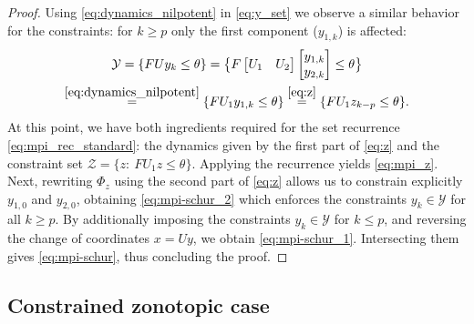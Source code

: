 \documentclass[journal,twoside,web]{ieeecolor}
\newcommand{\bbm}{\begin{bmatrix}}
\newcommand{\ebm}{\end{bmatrix}}
\newcommand{\bbm}{\begin{bmatrix}}
\newcommand{\ebm}{\end{bmatrix}}
\begin{document}
\begin{proof}
Using \eqref{eq:dynamics_nilpotent} in \eqref{eq:y_set} we observe a similar behavior for the constraints: for $k\geq p$ only the first component ($y_{1, k}$) is affected: 
\begin{multline}
\label{eq:z_set}
    \mathcal Y=\{FUy_{k}\leq \theta\}=\bigl\{F\bbm U_1 & U_2\ebm \bbm y_{1, k}\\ y_{2, k}\ebm\leq \theta\bigr\}\\
    \overset{\eqref{eq:dynamics_nilpotent}}{=}\{FU_1 y_{1,k}\leq \theta\}\overset{\eqref{eq:z}}{=}\{FU_1 z_{k-p}\leq \theta\}. 
\end{multline}
At this point, we have both ingredients required for the set recurrence \eqref{eq:mpi_rec_standard}: the dynamics given by the first part of \eqref{eq:z} and the constraint set $\mathcal{Z}=\{z:\: FU_1 z\leq \theta\}$. Applying the recurrence yields \eqref{eq:mpi_z}. Next, rewriting $\Phi_z$ using the second part of \eqref{eq:z} allows us to constrain explicitly $y_{1,0}$ and $y_{2,0}$, obtaining \eqref{eq:mpi-schur_2} which enforces the constraints $y_k \in \mathcal Y$ for all $k \geq p$. By additionally imposing the constraints $y_k \in \mathcal Y$ for $k \leq p$, and reversing the change of coordinates $x = Uy$, we obtain \eqref{eq:mpi-schur_1}. Intersecting them gives \eqref{eq:mpi-schur}, thus concluding the proof.
\end{proof}




\subsection{Constrained zonotopic case}
\end{document}
